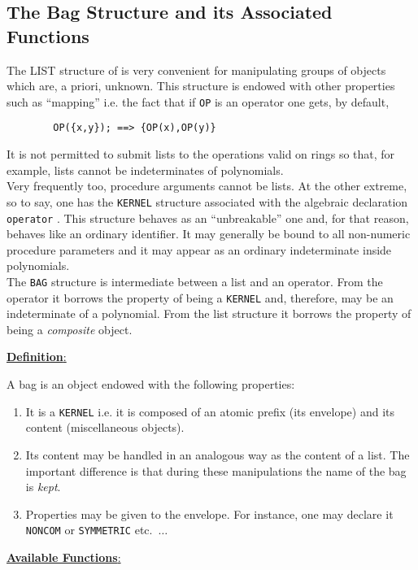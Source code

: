 \subsection{ The Bag Structure and its Associated Functions}
The LIST structure of \REDUCE is very convenient for manipulating
groups of objects which are, a priori, unknown. This structure is
endowed with other properties such as ``mapping'' i.e. the fact that
if \verb+OP+ is an operator one gets, by default,
\begin{verbatim}
        OP({x,y}); ==> {OP(x),OP(y)}
\end{verbatim}
It is not permitted to submit lists to the operations valid on rings
so that, for example, lists cannot be indeterminates of polynomials.\\
Very frequently too, procedure arguments cannot be lists.
At the other extreme, so to say, one has the \verb+KERNEL+
structure associated
with the algebraic declaration \verb+operator+ .  This structure behaves as
an ``unbreakable'' one and, for that reason, behaves
like an ordinary identifier.
It may generally be bound to all non-numeric procedure parameters
and it may appear
as an ordinary indeterminate inside polynomials. \\
The \verb+BAG+ structure is intermediate between a list and an operator.
From the operator it borrows the property of being a \verb+KERNEL+ and,
therefore, may be an indeterminate of a polynomial. From the list structure
it borrows the property of being a {\em composite} object.

\underline{{\bf Definition}:}

A bag is an object endowed with the following properties:
\begin{enumerate}
\item It is a \verb+KERNEL+ i.e. it is  composed of an atomic prefix (its
envelope) and
its content (miscellaneous objects).
\item Its content may be handled in an analogous way as the content of a
list. The important difference is that during these manipulations 
the name of the bag is {\em kept}.
\item Properties may be given to the envelope. For instance, one may
declare it \verb+NONCOM+ or \verb+SYMMETRIC+ etc.\ $\ldots$
\end{enumerate}

\underline{{\bf Available Functions}:}

